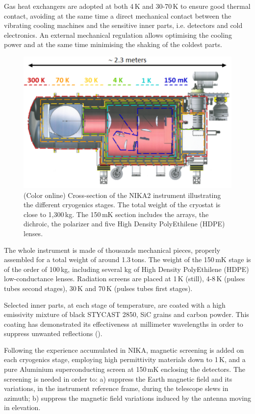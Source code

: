 \documentclass[]{aa} %
\begin{document}
Gas heat exchangers are adopted at both 4\,K and 30-70\,K to ensure good thermal contact, avoiding at the same time a direct mechanical contact between the vibrating cooling machines and the sensitive inner parts, i.e. detectors and cold electronics. An external mechanical regulation allows optimising the cooling power and at the same time minimising the shaking of the coldest parts. 

\begin{figure}[h]
   \centering
   \includegraphics[width=.95\linewidth]{NIKA2_cryoStages.png}
      \caption{(Color online) Cross-section of the NIKA2 instrument illustrating the different cryogenics stages. The total weight of the cryostat is close to 1,300\,kg. The 150\,mK section includes the arrays, the dichroic, the polarizer and five High Density PolyEthilene (HDPE) lenses.}
         \label{Cryostat_cryo}
\end{figure}

The whole instrument is made of thousands mechanical pieces, properly assembled for a total weight of around 1.3\,tons. The weight of the 150\,mK stage is of the order of 100\,kg, including several kg of High Density PolyEthilene (HDPE) low-conductance lenses. Radiation screens are placed at 1\,K (still), 4-8\,K (pulses tubes second stages), 30\,K and 70\,K (pulses tubes first stages).

Selected inner parts, at each stage of temperature, are coated with a high emissivity mixture of black STYCAST 2850, SiC grains and carbon powder. This coating has demonstrated its effectiveness at millimeter wavelengths in order to suppress unwanted reflections (\cite{Calvo2010}).

Following the experience accumulated in NIKA, magnetic screening is added on each cryogenics stage, employing high permittivity materials down to 1\,K, and a pure Aluminium superconducting screen at 150\,mK enclosing the detectors. The screening is needed in order to: a) suppress the Earth magnetic field and its variations, in the instrument reference frame, during the telescope slews in azimuth; b) suppress the magnetic field variations induced by the antenna moving in elevation. 
\end{document}
